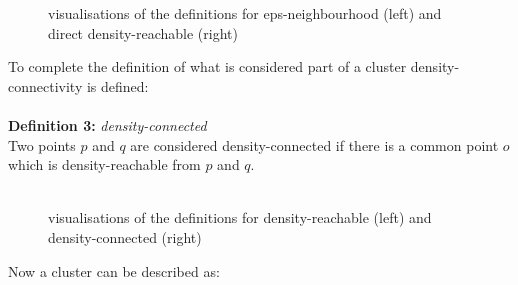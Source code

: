 \begin{figure}[H]
    \centering
    \qquad
    \caption{visualisations of the definitions for eps-neighbourhood (left) and direct density-reachable (right)}
\end{figure}
To complete the definition of what is considered part of a cluster density-connectivity is defined:\\
\ \\
\textbf{Definition 3:} \textit{density-connected}\\
Two points $p$ and $q$ are considered density-connected if there is a common point $o$ which is density-reachable from $p$ and $q$.\\
\ \\
\begin{figure}[H]
    \caption{visualisations of the definitions for density-reachable (left) and density-connected (right)}
\end{figure}
Now a cluster can be described as:\\
